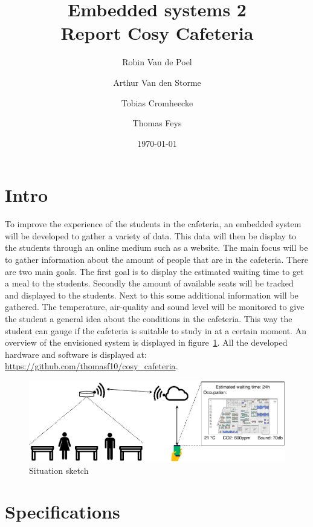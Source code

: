 \documentclass[11pt,a4paper]{article}
\begin{document}
\title{Embedded systems 2\\
	\Huge Report Cosy Cafeteria
}
\author{Robin Van de Poel\and Arthur Van den Storme\and Tobias Cromheecke\and Thomas Feys}
\date{\today}
\maketitle
\newpage

\tableofcontents
\newpage

\section{Intro}
To improve the experience of the students in the cafeteria, an embedded system will be developed to gather a variety of data. This data will then be display to the students through an online medium such as a website. The main focus will be to gather information about the amount of people that are in the cafeteria. There are two main goals. The first goal is to display the estimated waiting time to get a meal to the students. Secondly the amount of available seats will be tracked and displayed to the students. Next to this some additional information will be gathered. The temperature, air-quality and sound level will be monitored to give the student a general idea about the conditions in the cafeteria. This way the student can gauge if the cafeteria is suitable to study in at a certain moment. An overview of the envisioned system is displayed in figure~\ref{fig:system}. All the developed hardware and software is displayed at: \url{https://github.com/thomasf10/cosy_cafeteria}.
\begin{figure}[H]
	\centering
	\includegraphics[width=1.0\linewidth]{situation.pdf}
	\caption{Situation sketch}
	\label{fig:system}
\end{figure}

\section{Specifications}
\end{document}

